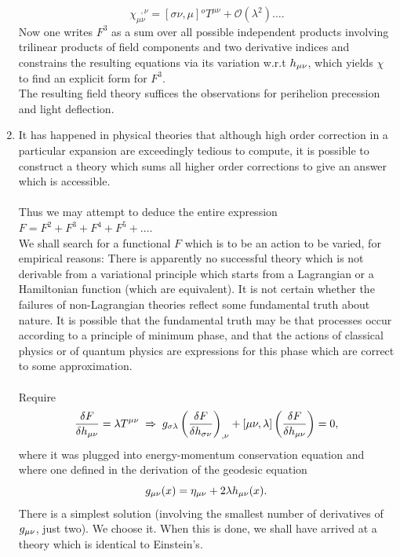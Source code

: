 \begin{enumerate}
\begin{equation}
	\chi^{\;\; ,\nu}_{\mu \nu}= [\sigma \nu, \mu] {}^o T^{\mu \nu} + \mathcal{O}(\lambda^2) \dots.
	\end{equation}
Now one writes $F^3$ as a sum over all possible independent products involving trilinear products of field components and two derivative indices and constrains the resulting equations via its variation w.r.t $h_{\mu \nu}$, which yields $\chi$ to find an explicit form for $F^3$.\\
The resulting field theory suffices the observations for perihelion precession and light deflection.
\item It has happened in physical theories that although high order correction in a particular expansion are exceedingly tedious to compute, it is possible to construct a theory which sums all higher order corrections to give an answer which is accessible. \\
\\ 
Thus we may attempt to deduce the entire expression $F=F^2+F^3+F^4+F^5+\dots$.\\
We shall search for a functional $F$ which is to be an action to be varied, for empirical reasons: There is apparently no successful theory which is not derivable from a variational principle which starts from a Lagrangian or a Hamiltonian function (which are equivalent). It is not certain whether the failures of non-Lagrangian theories reflect some fundamental truth about nature. It is possible that the fundamental truth may be that processes occur according to a principle of minimum phase, and that the actions of classical physics or of quantum physics are expressions for this phase which are correct to some approximation.\\
\\
Require
\begin{equation}
	\frac{\delta F}{\delta h_{\mu \nu}} = \lambda T^{\mu \nu} \; \Rightarrow \; g_{\sigma \lambda} \left(\frac{\delta F}{\delta h_{\sigma \nu}}\right)_{, \nu} + [\mu \nu,\lambda] \left(\frac{\delta F}{\delta h_{\mu \nu}}\right) = 0,
\end{equation}
where it was plugged into energy-momentum conservation equation and where one defined in the derivation of the geodesic equation 
\begin{equation}
	g_{\mu \nu}(x)=\eta_{\mu \nu} + 2 \lambda h_{\mu \nu}(x).
\end{equation}
There is a simplest solution (involving the smallest number of derivatives of $g_{\mu \nu}$, just two). We choose it. When this is done, we shall have arrived at a theory which is identical to Einstein's.

\end{enumerate}
